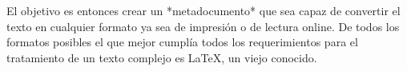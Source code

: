      
El objetivo es entonces crear un *metadocumento* que sea capaz de
convertir el texto en cualquier formato ya sea de impresión o de
lectura online. De todos los formatos posibles el que mejor cumplía
todos los requerimientos para el tratamiento de un texto complejo es
\LaTeX , un viejo conocido.

